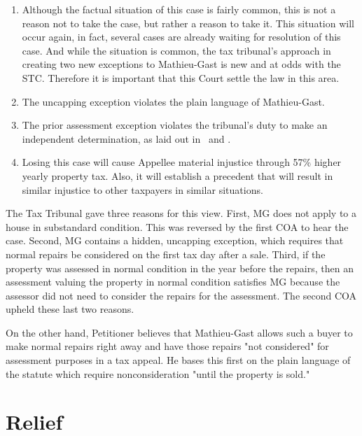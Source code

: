\documentclass[12pt,\documentclassflag]{michiganCourtOfAppealsBrief}
\begin{document}
\begin{enumerate}
\item Although the factual situation of this case is fairly common, this is not a reason not to take the case, but rather a reason to take it. This situation will occur again, in fact, several cases are already waiting for resolution of this case. And while the situation is common, the tax tribunal's approach in creating two new exceptions to Mathieu-Gast is new and at odds with the STC. Therefore it is important that this Court settle the law in this area.
\item The uncapping exception violates the plain language of Mathieu-Gast.
\item The prior assessment exception violates the tribunal's duty to make an independent determination, as laid out in \cite{Jones & Laughlin}\ and \cite{Great Lakes Div of Nat'l Steel Corp}.
\item Losing this case will cause Appellee material injustice through 57\% higher yearly property tax. Also, it will establish a precedent that will result in similar injustice to other taxpayers in similar situations.
\end{enumerate}







The Tax Tribunal gave three reasons for this view. First, MG does not apply to a house in substandard condition. This was reversed by the first COA to hear the case. Second, MG contains a hidden, uncapping exception, which requires that normal repairs be considered on the first tax day after a sale. Third, if the property was assessed in normal condition in the year before the repairs, then an assessment valuing the property in normal condition satisfies MG because the assessor did not need to consider the repairs for the assessment. The second COA upheld these last two reasons.

On the other hand, Petitioner believes that Mathieu-Gast allows such a buyer to make normal repairs right away and have those repairs "not considered" for assessment purposes in a tax appeal. He bases this first on the plain language of the statute which require nonconsideration "until the property is sold."

 


\section{Relief}
\end{document}

